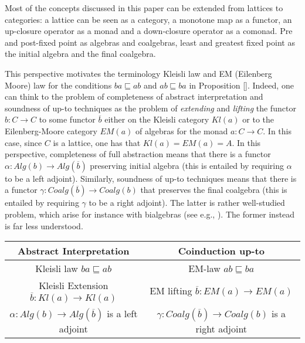 \documentclass{llncs}
\begin{document}
Most of the concepts discussed in this paper can be extended from lattices to categories: a lattice can be seen as a category, a monotone map as a functor, an up-closure operator as a monad and a down-closure operator as a comonad. Pre and post-fixed point as algebras and coalgebras, least and greatest fixed point as the initial algebra and the final coalgebra. 

\medskip

This perspective motivates the terminology Kleisli law and EM (Eilenberg Moore) law for the conditions $ba \sqsubseteq ab$ and $ab \sqsubseteq ba$ in Proposition \ref{}. Indeed, one can think to the problem of completeness of abstract interpretation and soundness of up-to techniques as the problem of \emph{extending} and \emph{lifting} the functor $b\colon C \to C$ to some functor $\overline{b}$ either on the Kleisli category $Kl(a)$ or to the Eilenberg-Moore category $EM(a)$ of algebras for the monad $a\colon C \to C$. In this case, since $C$ is a lattice, one has that $Kl(a) = EM(a) =A$. In this perspective, completeness of full abstraction means that there is a functor $\alpha \colon Alg(b) \to Alg(\overline{b})$ preserving initial algebra (this is entailed by requiring $\alpha$ to be a left adjoint). Similarly, soundness of up-to techniques means that there is a functor $\gamma \colon Coalg(\overline{b}) \to Coalg (b)$ that preserves the final coalgebra (this is entailed by requiring $\gamma$ to be a right adjoint). The latter is rather well-studied problem, which arise for instance with bialgebras (see e.g., \cite{DBLP:journals/tcs/Klin11,turi1997towards}). The former instead is far less understood. 

\medskip

\begin{tabular}{cc}
Abstract Interpretation & Coinduction up-to\\
\hline
Kleisli law $ba \sqsubseteq ab$ & EM-law $ab \sqsubseteq ba$  \\
Kleisli Extension $\overline{b} \colon Kl(a) \to Kl(a)$ & EM lifting $\overline{b} \colon EM(a) \to EM(a)$\\
$\alpha \colon Alg(b) \to Alg(\overline{b})$ is a left adjoint & $\gamma \colon Coalg(\overline{b}) \to Coalg (b)$ is a right adjoint \\
\end{tabular}
\end{document}
